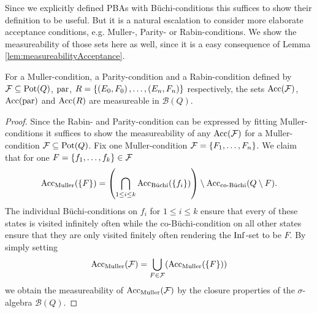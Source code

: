 Since we explicitly defined \acp{PBA} with Büchi-conditions this suffices to
show their definition to be useful. But it is a natural escalation to consider
more elaborate acceptance conditions, e.g. Muller-, Parity- or
Rabin-conditions. We show the measureability of those sets here as well, since
it is a easy consequence of Lemma \ref{lem:measureabilityAcceptance}.
\begin{corollary}
  For a Muller-condition, a Parity-condition and a Rabin-condition
  defined by $\mathcal{F}\subseteq\operatorname{Pot}(Q)$, $\operatorname{par}$, 
  $R = \left\{\left(E_{0}, F_{0}\right),\dots,\left(E_{n}, F_{n}\right)\right\}$ respectively, the 
  sets $\operatorname{Acc}(\mathcal{F})$, $\operatorname{Acc}(\operatorname{par})$ and $\operatorname{Acc}(R)$ are measureable in 
  $\mathcal{B}(Q)$.
  \label{cor:borelAcceptance}
\end{corollary}
\begin{proof}
  Since the Rabin- and Parity-condition can be expressed by fitting 
  Muller-conditions it suffices to show the measureability of any 
  $\operatorname{Acc}(\mathcal{F})$ for a Muller-condition $\mathcal{F}\subseteq\operatorname{Pot}(Q)$.
  Fix one Muller-condition $\mathcal{F} = \left\{F_{1},\dots,F_{n}\right\}$. We claim
  that for one $F = \left\{f_{1},\dots, f_{k}\right\}\in\mathcal{F}$
  \begin{equation*}
    \operatorname{Acc}_{\operatorname{Muller}}(\left\{F\right\}) = \left(
      \bigcap\limits_{1\leq i\leq k}\operatorname{Acc}_{\operatorname{B\ddot{u}chi}}(\left\{f_{i}\right\})\right)\setminus
      \operatorname{Acc}_{\operatorname{co-B\ddot{u}chi}}(Q\setminus F).
  \end{equation*}
  The individual Büchi-conditions on $f_{i}$ for $1\leq i\leq k$ ensure that 
  every of these states is visited infinitely often while the 
  co-Büchi-condition on all other states ensure that they are only visited
  finitely often rendering the $\operatorname{Inf}$-set to be $F$. By simply setting
  \begin{equation*}
    \operatorname{Acc}_{\operatorname{Muller}}(\mathcal{F}) = \bigcup\limits_{F\in\mathcal{F}}(
    \operatorname{Acc}_{\operatorname{Muller}}(\left\{F\right\}))
  \end{equation*}
  we obtain the measureability of $\operatorname{Acc}_{\operatorname{Muller}}(\mathcal{F})$ by the closure
  properties of the $\sigma$-algebra $\mathcal{B}(Q)$.
\end{proof}

